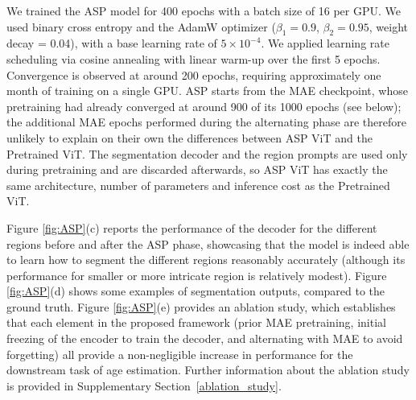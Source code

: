 \documentclass[pdflatex,sn-nature]{sn-jnl}%
\newif\ifhighlight
\newcommand{\rev}[1]{\ifhighlight{\color{blue}{}#1}\else#1\fi}%
\newcommand{\revdel}[1]{\ifhighlight{\color{red}\sout{#1}}\fi}
\theoremstyle{thmstyleone}%
\theoremstyle{thmstyletwo}%
\theoremstyle{thmstylethree}%
\begin{document}
We trained the ASP model for 400 epochs with a batch size of 16 per GPU. We used binary cross entropy and the AdamW optimizer ($\beta_{1} = 0.9$, $\beta_{2} = 0.95$, weight decay = 0.04), with a base learning rate of $5\times10^{-4}$. We applied learning rate scheduling via cosine annealing with linear warm-up over the first 5 epochs. Convergence is observed at around 200 epochs, requiring approximately one month of training on a single \revdel{42GB NVIDIA RTX8000} GPU. \rev{ASP starts from the MAE checkpoint, whose pretraining had already converged at around 900 of its 1000 epochs (see below); the additional MAE epochs performed during the alternating phase are therefore unlikely to explain on their own the differences between ASP ViT and the Pretrained ViT. The segmentation decoder and the region prompts are used only during pretraining and are discarded afterwards, so ASP ViT has exactly the same architecture, number of parameters and inference cost as the Pretrained ViT.}

Figure \ref{fig:ASP}(c) reports the performance of the decoder for the different regions before and after the ASP phase, showcasing that the model is indeed able to learn how to segment the different regions reasonably accurately (although its performance for smaller or more intricate region is relatively modest). Figure \ref{fig:ASP}(d) shows some examples of segmentation outputs, compared to the ground truth. Figure \ref{fig:ASP}(e) provides an ablation study, which establishes that each element in the proposed framework (prior MAE pretraining, initial freezing of the encoder to train the decoder, and alternating with MAE to avoid forgetting) all provide a non-negligible increase in performance for the downstream task of age estimation. Further information about the ablation study is provided in \rev{Supplementary Section~}\ref{ablation_study}.

  
\end{document}
